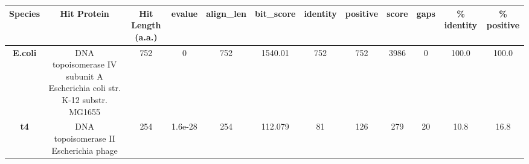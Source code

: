 \begin{tabular}{|c|c|c|c|c|c|c|c|c|c|c|c|} \hline
\textbf{Species} & \textbf{Hit Protein} & \textbf{Hit Length (a.a.)} & \textbf{evalue} & \textbf{align\_len} & \textbf{bit\_score} & \textbf{identity} & \textbf{positive} & \textbf{score} & \textbf{gaps} & \textbf{\% identity} & \textbf{\% positive} \\ \hline
\textbf{E.coli} & DNA topoisomerase IV subunit A Escherichia coli str. K-12 substr. MG1655 & 752 & 0 & 752 & 1540.01 & 752 & 752 & 3986 & 0 & 100.0 & 100.0\\
\textbf{t4} & DNA topoisomerase II Escherichia phage  & 254 & 1.6e-28 & 254 & 112.079 & 81 & 126 & 279 & 20 & 10.8 & 16.8\\
\hline \end{tabular}

